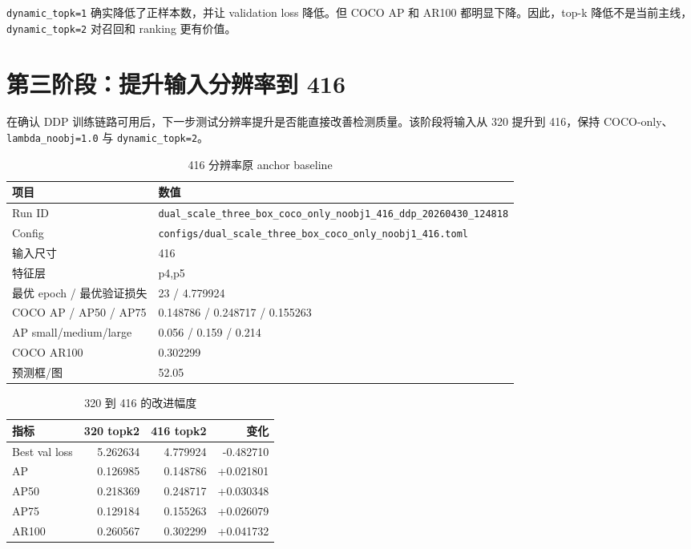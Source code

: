 \documentclass[11pt,a4paper]{article}
\begin{document}
\begin{CJK*}{UTF8}{gbsn}
\texttt{dynamic\_topk=1} 确实降低了正样本数，并让 validation loss 降低。但 COCO AP 和 AR100 都明显下降。因此，top-k 降低不是当前主线，\texttt{dynamic\_topk=2} 对召回和 ranking 更有价值。

\section{第三阶段：提升输入分辨率到 416}

在确认 DDP 训练链路可用后，下一步测试分辨率提升是否能直接改善检测质量。该阶段将输入从 320 提升到 416，保持 COCO-only、\texttt{lambda\_noobj=1.0} 与 \texttt{dynamic\_topk=2}。

\begin{table}[H]
  \centering
  \caption{416 分辨率原 anchor baseline}
  \label{tab:416-baseline}
  \begin{tabular}{ll}
    \toprule
    项目 & 数值 \\
    \midrule
    Run ID & \texttt{dual\_scale\_three\_box\_coco\_only\_noobj1\_416\_ddp\_20260430\_124818} \\
    Config & \texttt{configs/dual\_scale\_three\_box\_coco\_only\_noobj1\_416.toml} \\
    输入尺寸 & 416 \\
    特征层 & p4,p5 \\
    最优 epoch / 最优验证损失 & 23 / 4.779924 \\
    COCO AP / AP50 / AP75 & 0.148786 / 0.248717 / 0.155263 \\
    AP small/medium/large & 0.056 / 0.159 / 0.214 \\
    COCO AR100 & 0.302299 \\
    预测框/图 & 52.05 \\
    \bottomrule
  \end{tabular}
\end{table}

\begin{table}[H]
  \centering
  \caption{320 到 416 的改进幅度}
  \label{tab:320-to-416}
  \begin{tabular}{lrrr}
    \toprule
    指标 & 320 topk2 & 416 topk2 & 变化 \\
    \midrule
    Best val loss & 5.262634 & 4.779924 & -0.482710 \\
    AP & 0.126985 & 0.148786 & +0.021801 \\
    AP50 & 0.218369 & 0.248717 & +0.030348 \\
    AP75 & 0.129184 & 0.155263 & +0.026079 \\
    AR100 & 0.260567 & 0.302299 & +0.041732 \\
    \bottomrule
  \end{tabular}
\end{table}


\end{CJK*}
\end{document}
